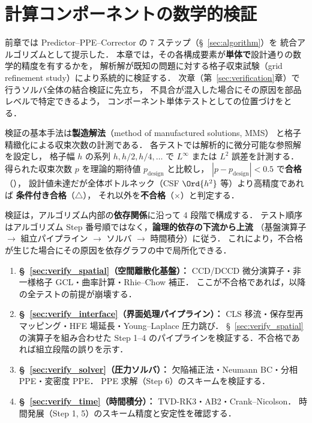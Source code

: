 %
\section{計算コンポーネントの数学的検証}
\label{sec:numerical_integrity}%
\label{sec:impl_collocate}%

前章では Predictor--PPE--Corrector の 7 ステップ（§~\ref{sec:algorithm}）を
統合アルゴリズムとして提示した．
本章では，その各構成要素が\textbf{単体で}設計通りの数学的精度を有するかを，
解析解が既知の問題に対する格子収束試験（grid refinement study）により系統的に検証する．
次章（第~\ref{sec:verification}章）で行うソルバ全体の結合検証に先立ち，
不具合が混入した場合にその原因を部品レベルで特定できるよう，
コンポーネント単体テストとしての位置づけをとる．

検証の基本手法は\textbf{製造解法}（method of manufactured solutions, MMS）
と格子精緻化による収束次数の計測である．
各テストでは解析的に微分可能な参照解を設定し，
格子幅 $h$ の系列 $h, h/2, h/4, \ldots$ で $L^\infty$ または $L^2$ 誤差を計測する．
得られた収束次数 $p$ を理論的期待値 $p_{\mathrm{design}}$ と比較し，
$|p - p_{\mathrm{design}}| < 0.5$ で\textbf{合格}（\checkmark），
設計値未達だが全体ボトルネック（CSF $\Ord{h^2}$ 等）より高精度であれば
\textbf{条件付き合格}（$\triangle$），
それ以外を\textbf{不合格}（$\times$）と判定する．

検証は，アルゴリズム内部の\textbf{依存関係}に沿って 4 段階で構成する．
テスト順序はアルゴリズム Step 番号順ではなく，\textbf{論理的依存の下流から上流}
（基盤演算子 $\to$ 組立パイプライン $\to$ ソルバ $\to$ 時間積分）に従う．
これにより，不合格が生じた場合にその原因を依存グラフの中で局所化できる．
\begin{enumerate}
  \item \textbf{§~\ref{sec:verify_spatial}（空間離散化基盤）：}
        CCD/DCCD 微分演算子・非一様格子 GCL・曲率計算・Rhie--Chow 補正．
        ここが不合格であれば，以降の全テストの前提が崩壊する．
  \item \textbf{§~\ref{sec:verify_interface}（界面処理パイプライン）：}
        CLS 移流・保存型再マッピング・HFE 場延長・Young--Laplace 圧力跳び．
        §~\ref{sec:verify_spatial} の演算子を組み合わせた
        Step 1--4 のパイプラインを検証する．不合格であれば組立段階の誤りを示す．
  \item \textbf{§~\ref{sec:verify_solver}（圧力ソルバ）：}
        欠陥補正法・Neumann BC・分相 PPE・変密度 PPE．
        PPE 求解（Step 6）のスキームを検証する．
  \item \textbf{§~\ref{sec:verify_time}（時間積分）：}
        TVD-RK3・AB2・Crank--Nicolson．
        時間発展（Step 1, 5）のスキーム精度と安定性を確認する．
\end{enumerate}

